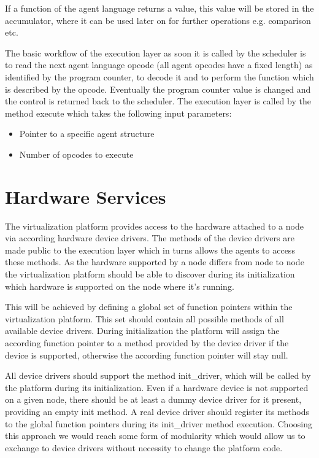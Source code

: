 \documentclass{scrreprt}
\begin{document}
\noindent
If a function of the agent language returns a value, this value will be stored in the accumulator, 
where it can be used later on for further operations e.g. comparison etc. 


\noindent
The basic workflow of the execution layer as soon it is called by the scheduler is to read the next 
agent language opcode (all agent opcodes have a fixed length) as identified by the program counter, 
to decode it and to perform the function which is described by the opcode. Eventually the program 
counter value is changed and the control is returned back to the scheduler. The execution layer is 
called by the method execute which takes the following input parameters:
\begin{itemize}
 \item Pointer to a specific agent structure
 \item Number of opcodes to execute
\end{itemize}



\section{Hardware Services}

The virtualization platform provides access to the hardware attached to a node via according hardware 
device drivers. The methods of the device drivers are made public to the execution layer which in turns 
allows the agents to access these methods. As the hardware supported by a node differs from node to node 
the virtualization platform should be able to discover during its initialization which hardware is supported 
on the node where it’s running. 


\noindent
This will be achieved by defining a global set of function pointers within the virtualization platform. 
This set should contain all possible methods of all available device drivers. During initialization the platform 
will assign the according function pointer to a method provided by the device driver if the device is supported, 
otherwise the according function pointer will stay null. 


\noindent
All device drivers should support the method init_driver, which will be called by the platform during its initialization. 
Even if a hardware device is not supported on a given node, there should be at least a dummy device driver for it present, 
providing an empty init method. A real device driver should register its methods to the global function pointers during its 
init_driver method execution. Choosing this approach we would reach some form of modularity which would allow us to exchange 
to device drivers without necessity to change the platform code.
\end{document}
